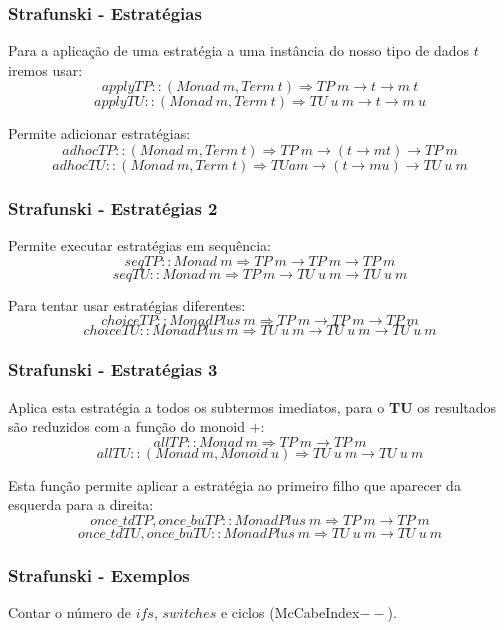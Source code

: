 \documentclass{beamer}
\begin{document}
\begin{frame} \frametitle{Strafunski - Estratégias}
Para a aplicação de uma estratégia a uma instância do nosso tipo de dados $t$ iremos usar:
$$applyTP :: (Monad~m, Term~t) \Rightarrow TP~m \rightarrow t \rightarrow m~t$$
$$applyTU :: (Monad~m, Term~t) \Rightarrow TU~u~m \rightarrow t \rightarrow m~u$$

Permite adicionar estratégias:
$$adhocTP :: (Monad~m, Term~t) \Rightarrow TP~m \rightarrow (t \rightarrow m t) \rightarrow TP~m$$
$$adhocTU :: (Monad~m, Term~t) \Rightarrow TU a m \rightarrow (t \rightarrow m u) \rightarrow TU~u~m$$
\end{frame}

\begin{frame} \frametitle{Strafunski - Estratégias 2}
Permite executar estratégias em sequência:
$$seqTP :: Monad~m \Rightarrow TP~m \rightarrow TP~m \rightarrow TP~m$$
$$seqTU :: Monad~m \Rightarrow TP~m \rightarrow TU~u~m \rightarrow TU~u~m$$

Para tentar usar estratégias diferentes:
$$choiceTP :: MonadPlus~m \Rightarrow TP~m \rightarrow TP~m \rightarrow TP~m$$
$$choiceTU :: MonadPlus~m \Rightarrow TU~u~m \rightarrow TU~u~m \rightarrow TU~u~m$$
\end{frame}

\begin{frame} \frametitle{Strafunski - Estratégias 3}
Aplica esta estratégia a todos os subtermos imediatos, para o \textbf{TU} os resultados são reduzidos com a função do monoid $+$:
$$allTP :: Monad~m \Rightarrow TP~m \rightarrow TP~m$$
$$allTU :: (Monad~m, Monoid~u) \Rightarrow TU~u~m \rightarrow TU~u~m$$

Esta função permite aplicar a estratégia ao primeiro filho que aparecer da esquerda para a direita:
$$once\_tdTP,once\_buTP :: MonadPlus~m \Rightarrow TP~m \rightarrow TP~m$$
$$once\_tdTU, once\_buTU :: MonadPlus~m \Rightarrow TU~u~m \rightarrow TU~u~m$$
\end{frame}

\begin{frame}[fragile] \frametitle{Strafunski - Exemplos}
Contar o número de $ifs$, $switches$ e ciclos (McCabeIndex$--$).
\end{frame}
\end{document}
